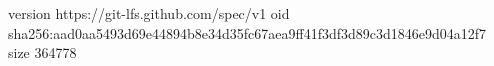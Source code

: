 version https://git-lfs.github.com/spec/v1
oid sha256:aad0aa5493d69e44894b8e34d35fc67aea9ff41f3df3d89c3d1846e9d04a12f7
size 364778
